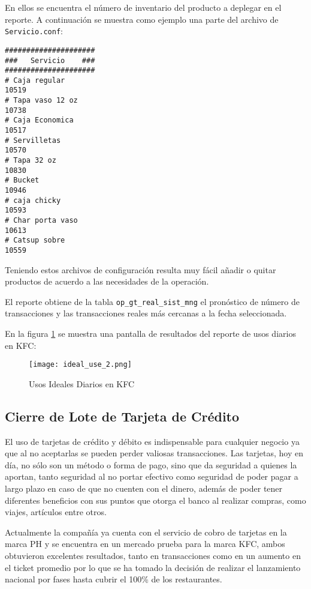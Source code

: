 En ellos se encuentra el número de inventario del producto a deplegar en el reporte. A continuación se muestra como ejemplo una parte del archivo de \texttt{Servicio.conf}:

\begin{Verbatim}[fontsize=\small]
#####################
###   Servicio    ###
#####################
# Caja regular
10519
# Tapa vaso 12 oz
10738
# Caja Economica
10517
# Servilletas
10570
# Tapa 32 oz
10830
# Bucket
10946
# caja chicky
10593
# Char porta vaso
10613
# Catsup sobre
10559
\end{Verbatim}

Teniendo estos archivos de configuración resulta muy fácil añadir o quitar productos de acuerdo a las necesidades de la operación.

El reporte obtiene de la tabla \texttt{op\_gt\_real\_sist\_mng} el pronóstico de número de transacciones y las transacciones reales más cercanas a la fecha seleccionada.

En la figura \ref{fig:usos_ideales_kfc} se muestra una pantalla de resultados del reporte de usos diarios en KFC:

\begin{figure}[htb]
 \begin{center}
  \texttt{[image: ideal\_use\_2.png]}
 \end{center}
 \caption{Usos Ideales Diarios en KFC}
 \label{fig:usos_ideales_kfc}
\end{figure}

\subsection{Cierre de Lote de Tarjeta de Crédito}
\label{sec:cierre_lote}

El uso de tarjetas de crédito y débito es indispensable para cualquier negocio ya que al no aceptarlas se pueden perder valiosas transacciones. Las tarjetas, hoy en día, no sólo son un método o forma de pago, sino que da seguridad a quienes la aportan, tanto seguridad al no portar efectivo como seguridad de poder pagar a largo plazo en caso de que no cuenten con el dinero, además de poder tener diferentes beneficios con sus puntos que otorga el banco al realizar compras, como viajes, artículos entre otros.

Actualmente la compañía ya cuenta con el servicio de cobro de tarjetas en la marca PH y se encuentra en un mercado prueba para la marca KFC, ambos obtuvieron excelentes resultados, tanto en transacciones como en un aumento en el ticket promedio por lo que se ha tomado la
decisión de realizar el lanzamiento nacional por fases hasta cubrir el 100\% de los restaurantes.

